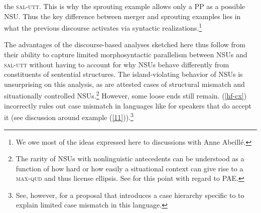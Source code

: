 the \textsc{sal-utt}. This is why the sprouting example allows only a PP as a possible NSU. Thus the key difference between
merger and sprouting examples lies in what the previous discourse
activates via syntactic realizations.\footnote{We owe most of the ideas expressed here to discussions
with Anne Abeill\'{e}.}
%
%
%
%
%
%
%

The advantages of the discourse-based analyses sketched here thus follow from their ability to capture limited morphosyntactic parallelism between NSUs and \textsc{sal-utt} without having to account for why NSUs behave differently from constituents of sentential structures. The island-violating behavior of NSUs is unsurprising on this analysis, as are attested cases of structural mismatch and situationally controlled NSUs.\footnote{The rarity of NSUs with nonlinguistic antecedents can be understood as a function of how hard or how easily a situational context can give rise to a \textsc{max-qud} and thus license ellipsis. See \citet{Miller2014b} for this point with regard to PAE.}
However, some loose ends still remain. (\ref{hf-cx}) %
incorrectly rules out case mismatch in languages like  for speakers that do accept it (see discussion around example (\ref{11})).\footnote{See, however, \citet{Kim2015} for a proposal that introduces a case hierarchy specific to  to explain limited case mismatch in this language.}




